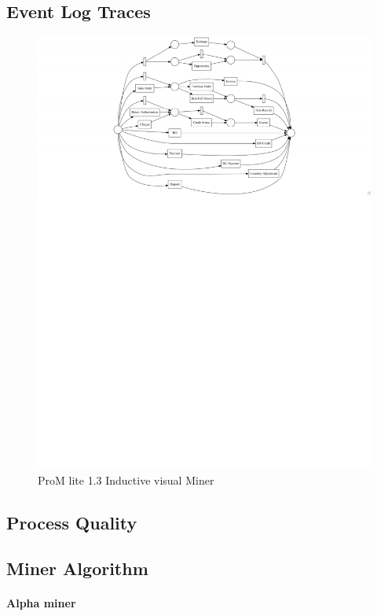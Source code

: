 \subsection{Event Log Traces}
\begin{figure}[!htb]
        \centering 
    \includegraphics[width =\textwidth, trim =1cm 17cm 0cm 0cm, clip]{resource/problem2.pdf}
    \caption{ProM lite 1.3 Inductive visual Miner}
    \label{figure:eventLogTraces2}

\end{figure}

\subsection{Process Quality}

\subsection{Miner Algorithm}

\paragraph{Alpha miner}

